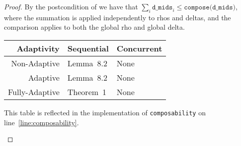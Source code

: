 \documentclass{article}
\begin{document}
\begin{proof}
  By the postcondition of  we have that $\sum_i \texttt{d\_mids}_i \le \texttt{compose(d\_mids)}$,
  where the summation is applied independently to rhos and deltas, and the comparison applies to both the global rho and global delta.

  \begin{center}
    \begin{tabular}{ r | l l }
      Adaptivity & Sequential & Concurrent \\ 
      \hline
      Non-Adaptive & Lemma~8.2\cite{bun2016concentrated} & None \\  
      Adaptive & Lemma~8.2\cite{bun2016concentrated} & None \\
      Fully-Adaptive & Theorem~1\cite{whitehouse2023fullyadaptive} & None
    \end{tabular}

    This table is reflected in the implementation of \texttt{composability} on line~\ref{line:composability}.
  \end{center}
  
\end{proof}



\end{document}
